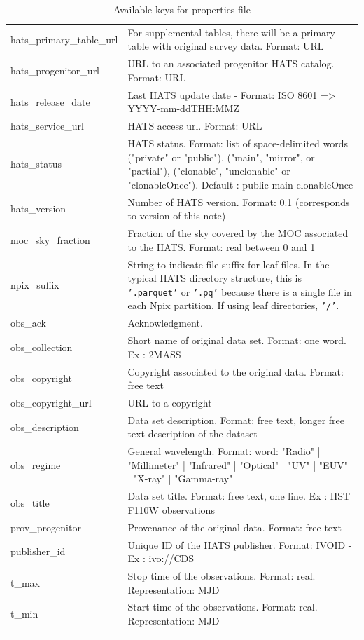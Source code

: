 \documentclass[11pt,a4paper]{ivoa}
\begin{document}
{\begin{longtable}[h!]{D{0.33\textwidth} D{0.67\textwidth}}
hats\_primary\_table\_url &For supplemental tables, there will be a primary table with original survey data. Format: URL\\
hats\_progenitor\_url &URL to an associated progenitor HATS catalog. Format: URL \\
hats\_release\_date &Last HATS update date - Format: ISO 8601 => YYYY-mm-ddTHH:MMZ \\
hats\_service\_url &HATS access url. Format: URL \\
hats\_status &HATS status. Format: list of space-delimited words ("private" or "public"), ("main", "mirror", or "partial"), ("clonable", "unclonable" or "clonableOnce"). Default : public main clonableOnce \\
hats\_version &Number of HATS version. Format: 0.1 (corresponds to version of this note) \\
moc\_sky\_fraction &Fraction of the sky covered by the MOC associated to the HATS. Format: real between 0 and 1 \\
npix\_suffix & String to indicate file suffix for leaf files. In the typical HATS directory structure, this is \texttt{'.parquet'} or \texttt{'.pq'} because there is a single file in each Npix partition. If using leaf directories, \texttt{'/'}. \\
obs\_ack &Acknowledgment. \\
obs\_collection &Short name of original data set. Format: one word. Ex : 2MASS \\
obs\_copyright &Copyright associated to the original data. Format: free text \\
obs\_copyright\_url &URL to a copyright  \\
obs\_description &Data set description. Format: free text, longer free text description of the dataset \\
obs\_regime &General wavelength. Format: word: "Radio" | "Millimeter" | "Infrared" | "Optical" | "UV" | "EUV" | "X-ray" | "Gamma-ray" \\
obs\_title &Data set title. Format: free text, one line. Ex : HST F110W observations \\
prov\_progenitor &Provenance of the original data. Format: free text \\
publisher\_id &Unique ID of the HATS publisher. Format: IVOID - Ex : ivo://CDS \\
t\_max &Stop time of the observations. Format: real. Representation: MJD \\
t\_min &Start time of the observations. Format: real. Representation: MJD \\
\sptablerule    
\caption{Available keys for properties file}
\label{tab:properties}
\end{longtable}}
\end{document}
